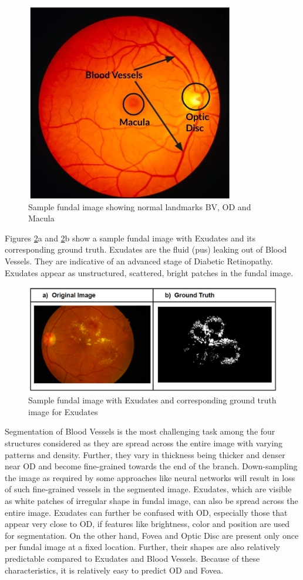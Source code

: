 \documentclass[utf8]{FrontiersinHarvard} %
\begin{document}
\begin{figure}
\centering
\includegraphics[width=0.5\linewidth]{images/fundal_fovea_bv_od.jpg}
\caption{Sample fundal image showing normal landmarks BV, OD and Macula}
\label{fig:sample_funal_image}
\end{figure}

Figures \ref{fig:exudates_with_gt}a and \ref{fig:exudates_with_gt}b show a sample  fundal image with Exudates and its corresponding ground truth. Exudates are the fluid (pus) leaking out of Blood Vessels. They are indicative of an advanced stage of Diabetic Retinopathy. Exudates appear as unstructured, scattered, bright patches in the fundal image.

\begin{figure}
\centering
\includegraphics[width=0.8\linewidth]{images/exudates_with_gt.jpg}
\caption{Sample fundal image with Exudates and corresponding ground truth image for Exudates}
\label{fig:exudates_with_gt}
\end{figure}

Segmentation of Blood Vessels  is the most challenging task among the four structures considered as they are spread across the entire image with varying patterns and density. Further, they vary in thickness  being  thicker  and denser near OD and become fine-grained towards the end of the branch.  Down-sampling the image as required by some approaches like neural networks will result in loss of such fine-grained vessels in the segmented image. Exudates, which are visible  as white patches of irregular shape in fundal image, can also be spread across the entire image. Exudates can  further  be confused with OD, especially those that appear very close to OD, if features like brightness, color and position  are used for segmentation. On the other hand, Fovea and Optic Disc are present only once per fundal image at a fixed location. Further,  their shapes are also relatively predictable compared to Exudates and Blood Vessels. Because of these characteristics, it is relatively easy to predict OD and Fovea.
\end{document}
